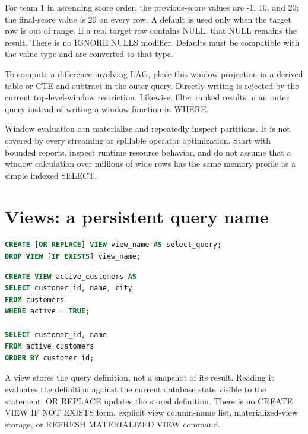 For team 1 in ascending score order, the previous-score values are -1, 10, and 20; the final-score value is 20 on every row. A default is used only when the target row is out of range. If a real target row contains NULL, that NULL remains the result. There is no IGNORE NULLS modifier. Defaults must be compatible with the value type and are converted to that type.

To compute a difference involving LAG, place this window projection in a derived table or CTE and subtract in the outer query. Directly writing  is rejected by the current top-level-window restriction. Likewise, filter ranked results in an outer query instead of writing a window function in WHERE.

Window evaluation can materialize and repeatedly inspect partitions. It is not covered by every streaming or spillable operator optimization. Start with bounded reports, inspect runtime resource behavior, and do not assume that a window calculation over millions of wide rows has the same memory profile as a simple indexed SELECT.


\section{Views: a persistent query name}
\label{sql:views}

\begin{lstlisting}[language=SQL]
CREATE [OR REPLACE] VIEW view_name AS select_query;
DROP VIEW [IF EXISTS] view_name;
\end{lstlisting}

\begin{lstlisting}[language=SQL]
CREATE VIEW active_customers AS
SELECT customer_id, name, city
FROM customers
WHERE active = TRUE;

SELECT customer_id, name
FROM active_customers
ORDER BY customer_id;
\end{lstlisting}

A view stores the query definition, not a snapshot of its result. Reading it evaluates the definition against the current database state visible to the statement. OR REPLACE updates the stored definition. There is no CREATE VIEW IF NOT EXISTS form, explicit view column-name list, materialized-view storage, or REFRESH MATERIALIZED VIEW command.

